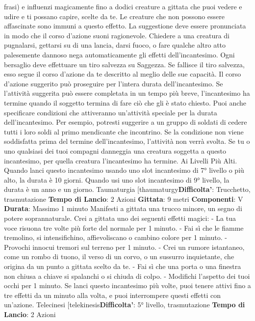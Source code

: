 \begin{multicols}{2}
frasi) e influenzi magicamente fino a dodici creature a
gittata che puoi vedere e udire e ti possano capire,
scelte da te. Le creature che non possono essere
affascinate sono immuni a questo effetto. La
suggestione deve essere pronunciata in modo che il
corso d’azione suoni ragionevole. Chiedere a una
creatura di pugnalarsi, gettarsi su di una lancia, darsi
fuoco, o fare qualche altro atto palesemente dannoso
nega automaticamente gli effetti dell’incantesimo.
Ogni bersaglio deve effettuare un tiro salvezza su
Saggezza. Se fallisce il tiro salvezza, esso segue il
corso d’azione da te descritto al meglio delle sue
capacità. Il corso d’azione suggerito può proseguire per
l’intera durata dell’incantesimo. Se l’attività suggerita
può essere completata in un tempo più breve,
l’incantesimo ha termine quando il soggetto termina di
fare ciò che gli è stato chiesto.
Puoi anche specificare condizioni che attiveranno
un’attività speciale per la durata dell’incantesimo. Per
esempio, potresti suggerire a un gruppo di soldati di
cedere tutti i loro soldi al primo mendicante che
incontrino. Se la condizione non viene soddisfatta prima
del termine dell’incantesimo, l’attività non verrà svolta.
Se tu o uno qualsiasi dei tuoi compagni danneggia una
creatura soggetta a questo incantesimo, per quella
creatura l’incantesimo ha termine.
Ai Livelli Più Alti. Quando lanci questo incantesimo
usando uno slot incantesimo di 7° livello o più alto, la
durata è 10 giorni. Quando usi uno slot incantesimo di
9° livello, la durata è un anno e un giorno.
Taumaturgia
[thaumaturgy\textbf{Difficolta'}:
Trucchetto, trasmutazione
\textbf{Tempo di Lancio}: 2 Azioni
\textbf{Gittata}: 9 metri
\textbf{Componenti}: V
\textbf{Durata}: Massimo 1 minuto
Manifesti a gittata una trucco minore, un segno di
potere soprannaturale. Crei a gittata uno dei seguenti
effetti magici:
- La tua voce risuona tre volte più forte del normale
per 1 minuto.
- Fai sì che le fiamme tremolino, si intensifichino,
affievoliscano o cambino colore per 1 minuto.
- Provochi innocui tremori sul terreno per 1 minuto.
- Crei un rumore istantaneo, come un rombo di tuono,
il verso di un corvo, o un sussurro inquietante, che
origina da un punto a gittata scelto da te.
- Fai sì che una porta o una finestra non chiusa a
chiave si spalanchi o si chiuda di colpo.
- Modifichi l’aspetto dei tuoi occhi per 1 minuto.
Se lanci questo incantesimo più volte, puoi tenere attivi
fino a tre effetti da un minuto alla volta, e puoi
interrompere questi effetti con un’azione.
Telecinesi
[telekinesis\textbf{Difficolta'}:
5° livello, trasmutazione
\textbf{Tempo di Lancio}: 2 Azioni

\end{multicols}
